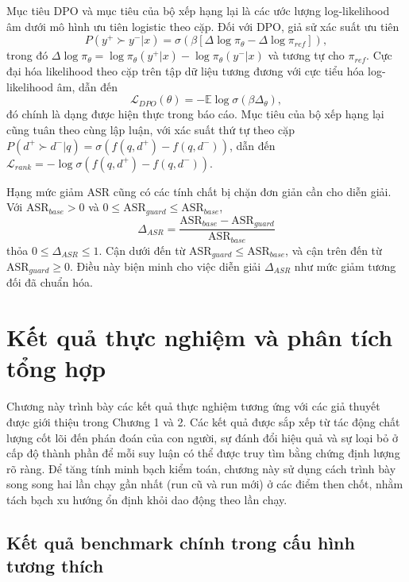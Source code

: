 ﻿\documentclass[a4paper,12pt]{article}
\begin{document}
Mục tiêu DPO và mục tiêu của bộ xếp hạng lại là các ước lượng log-likelihood âm dưới mô hình ưu tiên logistic theo cặp. Đối với DPO, giả sử xác suất ưu tiên
\begin{equation}
P(y^+\succ y^-|x)=\sigma\!\left(\beta\left[\Delta\log\pi_\theta-\Delta\log\pi_{ref}\right]\right),
\end{equation}
trong đó \(\Delta\log\pi_\theta=\log\pi_\theta(y^+|x)-\log\pi_\theta(y^-|x)\) và tương tự cho \(\pi_{ref}\). Cực đại hóa likelihood theo cặp trên tập dữ liệu tương đương với cực tiểu hóa log-likelihood âm, dẫn đến
\begin{equation}
\mathcal{L}_{DPO}(\theta)=-\mathbb{E}\log \sigma\!\left(\beta\Delta_\theta\right),
\end{equation}
đó chính là dạng được hiện thực trong báo cáo. Mục tiêu của bộ xếp hạng lại cũng tuân theo cùng lập luận, với xác suất thứ tự theo cặp \(P(d^+\succ d^-|q)=\sigma(f(q,d^+)-f(q,d^-))\), dẫn đến \(\mathcal{L}_{rank}=-\log \sigma(f(q,d^+)-f(q,d^-))\).

Hạng mức giảm ASR cũng có các tính chất bị chặn đơn giản cần cho diễn giải. Với \(\mathrm{ASR}_{base}>0\) và \(0\le \mathrm{ASR}_{guard}\le \mathrm{ASR}_{base}\),
\begin{equation}
\Delta_{ASR}=\frac{\mathrm{ASR}_{base}-\mathrm{ASR}_{guard}}{\mathrm{ASR}_{base}}
\end{equation}
thỏa \(0\le\Delta_{ASR}\le1\). Cận dưới đến từ \(\mathrm{ASR}_{guard}\le\mathrm{ASR}_{base}\), và cận trên đến từ \(\mathrm{ASR}_{guard}\ge0\). Điều này biện minh cho việc diễn giải \(\Delta_{ASR}\) như mức giảm tương đối đã chuẩn hóa.

\section{Kết quả thực nghiệm và phân tích tổng hợp}
Chương này trình bày các kết quả thực nghiệm tương ứng với các giả thuyết được giới thiệu trong Chương 1 và 2. Các kết quả được sắp xếp từ tác động chất lượng cốt lõi đến phán đoán của con người, sự đánh đổi hiệu quả và sự loại bỏ ở cấp độ thành phần để mỗi suy luận có thể được truy tìm bằng chứng định lượng rõ ràng.
Để tăng tính minh bạch kiểm toán, chương này sử dụng cách trình bày song song hai lần chạy gần nhất (run cũ và run mới) ở các điểm then chốt, nhằm tách bạch xu hướng ổn định khỏi dao động theo lần chạy.
\subsection{Kết quả benchmark chính trong cấu hình tương thích}
\end{document}
